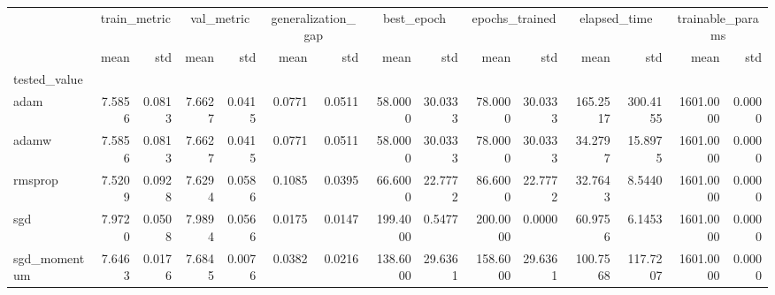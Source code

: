 \begin{tabular}{lrrrrrrrrrrrrrr}
\toprule
 & \multicolumn{2}{c}{train_metric} & \multicolumn{2}{c}{val_metric} & \multicolumn{2}{c}{generalization_gap} & \multicolumn{2}{c}{best_epoch} & \multicolumn{2}{c}{epochs_trained} & \multicolumn{2}{c}{elapsed_time} & \multicolumn{2}{c}{trainable_params} \\
 & mean & std & mean & std & mean & std & mean & std & mean & std & mean & std & mean & std \\
tested_value &  &  &  &  &  &  &  &  &  &  &  &  &  &  \\
\midrule
adam & 7.5856 & 0.0813 & 7.6627 & 0.0415 & 0.0771 & 0.0511 & 58.0000 & 30.0333 & 78.0000 & 30.0333 & 165.2517 & 300.4155 & 1601.0000 & 0.0000 \\
adamw & 7.5856 & 0.0813 & 7.6627 & 0.0415 & 0.0771 & 0.0511 & 58.0000 & 30.0333 & 78.0000 & 30.0333 & 34.2797 & 15.8975 & 1601.0000 & 0.0000 \\
rmsprop & 7.5209 & 0.0928 & 7.6294 & 0.0586 & 0.1085 & 0.0395 & 66.6000 & 22.7772 & 86.6000 & 22.7772 & 32.7643 & 8.5440 & 1601.0000 & 0.0000 \\
sgd & 7.9720 & 0.0508 & 7.9894 & 0.0566 & 0.0175 & 0.0147 & 199.4000 & 0.5477 & 200.0000 & 0.0000 & 60.9756 & 6.1453 & 1601.0000 & 0.0000 \\
sgd_momentum & 7.6463 & 0.0176 & 7.6845 & 0.0076 & 0.0382 & 0.0216 & 138.6000 & 29.6361 & 158.6000 & 29.6361 & 100.7568 & 117.7207 & 1601.0000 & 0.0000 \\
\bottomrule
\end{tabular}
